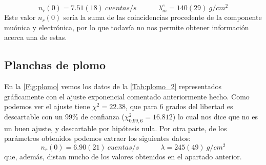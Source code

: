 \documentclass[11pt]{article}
\newcommand{\tquad}{\quad \quad \quad}
\begin{document}
\begin{equation}
	n_r(0) = 7.51(18) \ \unit{cuentas/s}  \tquad \lambda_m^e = 140(29) \ \unit{g/cm^2}
\end{equation}
Este valor $n_r(0)$ sería la suma de las coincidencias procedente de la componente muónica y electrónica, por lo que todavía no nos permite obtener información acerca una de estas.


\subsection{Planchas de plomo}

En la \cref{Fig:plomo} vemos los datos de la \cref{Tab:plomo_2} representados gráficamente con el ajuste exponencial comentado anteriormente hecho. Como podemos ver el ajuste tiene $\chi^2=22.38$, que  para 6 grados del libertad es descartable con un 99\% de confianza ($\chi^2_{0.99,6}=16.812$) lo cual nos dice que no es un buen ajuste, y descartable por hipótesis nula. Por otra parte, de los parámetros obtenidos podemos extraer los siguientes datos: 
\begin{equation}
	n_r(0) = 6.90(21) \ \unit{cuentas/s}  \tquad \lambda = 245(49) \ \unit{g/cm^2}
\end{equation}
que, además, distan mucho de los valores obtenidos en el apartado anterior.
\end{document}
